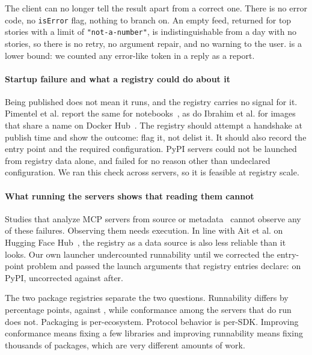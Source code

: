 The client can no longer tell the result apart from a correct one. There is no error
code, no \texttt{isError} flag, nothing to branch on. An empty feed, returned for top
stories with a limit of \texttt{"not-a-number"}, is indistinguishable from a day with
no stories, so there is no retry, no argument repair, and no warning to the user. \NSilentExec{} is a
lower bound: we counted any error-like token in a reply as a report.

\paragraph{Startup failure and what a registry could do about it}
Being published does not mean it runs, and the registry carries no signal for it.
Pimentel et al. report the same for notebooks~\cite{notebookreproducibility}, as do
Ibrahim et al. for images that share a name on Docker Hub~\cite{dockerhubimages}. The
registry should attempt a handshake at publish time and show the outcome: flag it,
not delist it. It should also record the entry point and the required configuration.
\NEntrypointBlocked{} PyPI servers could not be launched from registry data alone,
and \NNeedsConfig{} failed for no reason other than undeclared configuration. We ran
this check across \Nprobed{} servers, so it is feasible at registry scale.

\paragraph{What running the servers shows that reading them cannot}
Studies that analyze MCP servers from source or
metadata~\cite{mcpfirstglance,mcplandscape} cannot observe any of these failures.
Observing them needs execution. In line with Ait et al. on Hugging Face Hub~\cite{huggingfacehub}, the registry as a
data source is also less reliable than it looks. Our own launcher undercounted
runnability until we corrected the entry-point problem and passed the launch arguments
that registry entries declare: on PyPI, \PypiRateRaw{} uncorrected against
\PypiRateCorr{} after.

The two package registries separate the two questions. Runnability differs by
\GapCorr{} percentage points, \NpmRateCorr{} against \PypiRateCorr{}, while conformance
among the servers that do run does not. Packaging is per-ecosystem. Protocol behavior
is per-SDK. Improving conformance means fixing a few libraries and improving
runnability means fixing thousands of packages, which are very different amounts of
work.

